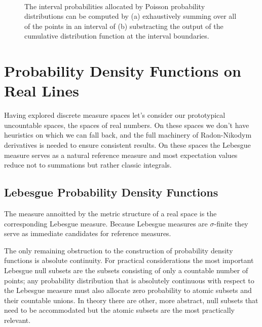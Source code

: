\documentclass[
  letterpaper,
  DIV=11,
  numbers=noendperiod]{scrartcl}
\begin{document}
\begin{figure}
\begin{minipage}[t]{0.45\linewidth}
{{}

}

\subcaption{\label{fig-poisson-diff}}
\end{minipage}%
%
\begin{minipage}[t]{0.05\linewidth}

{\centering 

~

}

\end{minipage}%

\caption{\label{fig-poisson-interval-prob}The interval probabilities
allocated by Poisson probability distributions can be computed by (a)
exhaustively summing over all of the points in an interval of (b)
substracting the output of the cumulative distribution function at the
interval boundaries.}

\end{figure}

\hypertarget{probability-density-functions-on-real-lines}{%
\section{Probability Density Functions on Real
Lines}\label{probability-density-functions-on-real-lines}}

Having explored discrete measure spaces let's consider our prototypical
uncountable spaces, the spaces of real numbers. On these spaces we don't
have heuristics on which we can fall back, and the full machinery of
Radon-Nikodym derivatives is needed to ensure consistent results. On
these spaces the Lebesgue measure serves as a natural reference measure
and most expectation values reduce not to summations but rather classic
integrals.

\hypertarget{lebesgue-probability-density-functions}{%
\subsection{Lebesgue Probability Density
Functions}\label{lebesgue-probability-density-functions}}

The measure annoitted by the metric structure of a real space is the
corresponding Lebesgue measure. Because Lebesgue measures are
\(\sigma\)-finite they serve as immediate candidates for reference
measures.

The only remaining obstruction to the construction of probability
density functions is absolute continuity. For practical considerations
the most important Lebesgue null subsets are the subsets consisting of
only a countable number of points; any probability distribution that is
absolutely continuous with respect to the Lebesgue measure must also
allocate zero probability to atomic subsets and their countable unions.
In theory there are other, more abstract, null subsets that need to be
accommodated but the atomic subsets are the most practically relevant.
\end{document}
